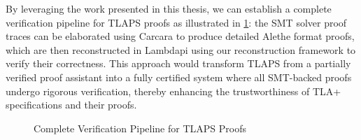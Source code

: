 By leveraging the work presented in this thesis, we can establish a complete verification pipeline for TLAPS proofs as illustrated in \cref{"Complete Verification Pipeline for TLAPS Proofs"
}: the SMT solver proof traces can be elaborated using Carcara to produce detailed Alethe format proofs, which are then reconstructed in Lambdapi using our reconstruction framework to verify their correctness.
This approach would transform TLAPS from a partially verified proof assistant into a fully certified system where all SMT-backed proofs undergo rigorous verification, thereby enhancing the trustworthiness of TLA+ specifications and their proofs.

\begin{figure}

\caption{Complete Verification Pipeline for TLAPS Proofs}
\label{"Complete Verification Pipeline for TLAPS Proofs"
}
\end{figure}